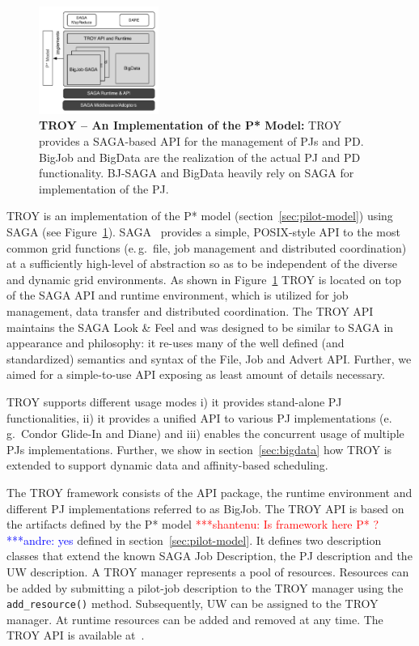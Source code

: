 \documentclass[conference,final]{IEEEtran}
\newcommand{\jhanote}[1]{ {\textcolor{red} { ***shantenu: #1 }}}
\newcommand{\alnote}[1]{ {\textcolor{blue} { ***andre: #1 }}}
\newcommand{\alnote}[1]{}
\newcommand{\jhanote}[1]{}
\newcommand{\upp}{\vspace*{-0.5em}}
\begin{document}

\begin{figure}[t]
	\centering
		\includegraphics[width=0.35\textwidth]{figures/pstar_troy.pdf}
	\caption{\textbf{TROY -- An Implementation of the P* Model:}  TROY provides 
	a SAGA-based API for the management of PJs and PD. BigJob and BigData are 
	the realization of the actual PJ and PD functionality. BJ-SAGA and BigData 
	heavily rely on SAGA for implementation of the PJ.\upp
	}
	\label{fig:figures_pstar_troy}
\end{figure}

TROY is an implementation of the P* model (section~\ref{sec:pilot-model}) using
SAGA (see Figure~\ref{fig:figures_pstar_troy}). SAGA~\cite{saga_url,saga_gfd90}
provides a simple, POSIX-style API to the most common grid functions (e.\,g.\
file, job management and distributed coordination) at a sufficiently high-level
of abstraction so as to be independent of the diverse and dynamic grid
environments. As shown in Figure~\ref{fig:figures_pstar_troy} TROY is located on
top of the SAGA API and runtime environment, which is utilized for job
management, data transfer and distributed coordination. The TROY API maintains
the SAGA Look \& Feel and was designed to be similar to SAGA in appearance and
philosophy: it re-uses many of the well defined (and standardized) semantics and
syntax of the File, Job and Advert API. Further, we aimed for a simple-to-use
API exposing as least amount of details necessary.

TROY supports different usage modes i) it provides stand-alone
PJ functionalities, ii) it provides a unified API to various
PJ implementations (e.\,g.\ Condor Glide-In and Diane) and iii)
enables the concurrent usage of multiple PJs
implementations. Further, we show in section~\ref{sec:bigdata} how
TROY is extended to support dynamic data and affinity-based
scheduling.

The TROY framework consists of the API package, the runtime environment and
different PJ implementations referred to as BigJob. The TROY API is based on the
artifacts defined by the P* model \jhanote{Is framework here P* ?}\alnote{yes} defined in
section~\ref{sec:pilot-model}. It defines two description classes that extend
the known SAGA Job Description, the PJ description and the UW description. A
TROY manager represents a pool of resources. Resources can be added by
submitting a pilot-job description to the TROY manager using the
\texttt{add\_resource()} method. Subsequently, UW can be assigned to the TROY
manager. At runtime resources can be added and removed at any time. 
The TROY API is available at~\cite{troy_api}.
\end{document}

